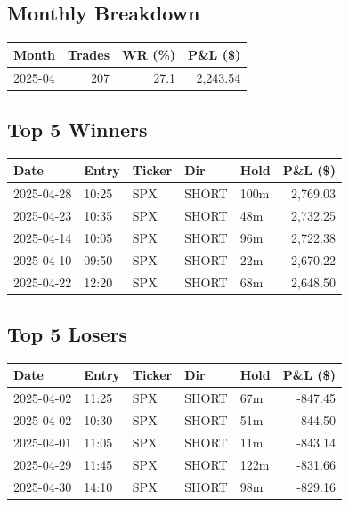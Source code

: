 \documentclass[11pt,a4paper]{article}
\begin{document}
\subsection*{Monthly Breakdown}
\noindent\begin{center}
\begin{tabular}{>{\color{txtmain}}l rrr}
\toprule
\rowcolor{cardbg}
\textbf{Month} & \textbf{Trades} & \textbf{WR (\%)} & \textbf{P\&L (\$)} \\
\midrule
2025-04 & 207 & 27.1 & \textcolor{wingreen}{2,243.54} \\
\bottomrule
\end{tabular}
\end{center}
\subsection*{Top 5 Winners}
\noindent\begin{center}
\begin{tabular}{>{\color{txtmain}}l llll r}
\toprule
\rowcolor{cardbg}
\textbf{Date} & \textbf{Entry} & \textbf{Ticker} & \textbf{Dir} & \textbf{Hold} & \textbf{P\&L (\$)} \\
\midrule
2025-04-28 & 10:25 & SPX & SHORT & 100m & \textcolor{wingreen}{2,769.03} \\
2025-04-23 & 10:35 & SPX & SHORT & 48m & \textcolor{wingreen}{2,732.25} \\
2025-04-14 & 10:05 & SPX & SHORT & 96m & \textcolor{wingreen}{2,722.38} \\
2025-04-10 & 09:50 & SPX & SHORT & 22m & \textcolor{wingreen}{2,670.22} \\
2025-04-22 & 12:20 & SPX & SHORT & 68m & \textcolor{wingreen}{2,648.50} \\
\bottomrule
\end{tabular}
\end{center}
\subsection*{Top 5 Losers}
\noindent\begin{center}
\begin{tabular}{>{\color{txtmain}}l llll r}
\toprule
\rowcolor{cardbg}
\textbf{Date} & \textbf{Entry} & \textbf{Ticker} & \textbf{Dir} & \textbf{Hold} & \textbf{P\&L (\$)} \\
\midrule
2025-04-02 & 11:25 & SPX & SHORT & 67m & \textcolor{lossred}{-847.45} \\
2025-04-02 & 10:30 & SPX & SHORT & 51m & \textcolor{lossred}{-844.50} \\
2025-04-01 & 11:05 & SPX & SHORT & 11m & \textcolor{lossred}{-843.14} \\
2025-04-29 & 11:45 & SPX & SHORT & 122m & \textcolor{lossred}{-831.66} \\
2025-04-30 & 14:10 & SPX & SHORT & 98m & \textcolor{lossred}{-829.16} \\
\bottomrule
\end{tabular}
\end{center}
\clearpage
\end{document}
